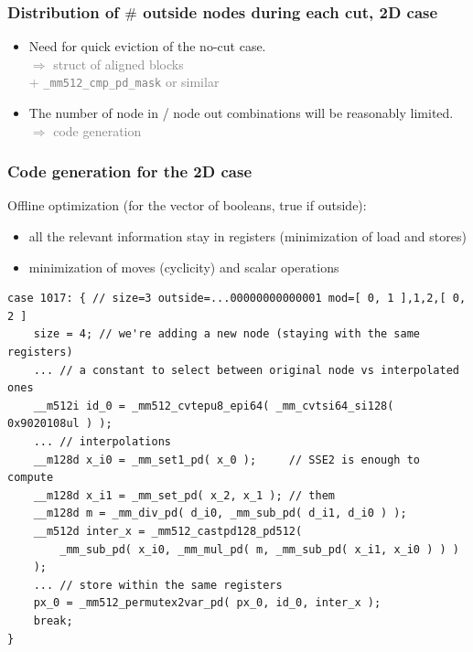 \documentclass[aspectratio=169]{beamer}
\begin{document}
\begin{frame}
    \frametitle{Distribution of $\#$ outside nodes during each cut, 2D case}

    \begin{minipage}[c][0.6\textheight][c]{0.4\textwidth}
        
    \end{minipage}
    \textwidth
    \begin{minipage}{0.55\textwidth}
        \begin{itemize}
            \item Need for quick eviction of the no-cut case.
            \\ \hfill {\textcolor{gray}{$\Rightarrow$ struct of aligned blocks}}
            \\ \hfill {\textcolor{gray}{+ \texttt{\_mm512\_cmp\_pd\_mask} or similar}}
            
            \bigskip
            \item The number of node in / node out combinations will be reasonably limited. 
            \\ \hfill {\textcolor{gray}{$\Rightarrow$ code generation}}
        \end{itemize}
    \end{minipage}
\end{frame}


\begin{frame}[fragile]
    \frametitle{Code generation for the 2D case}

    Offline optimization (for the vector of booleans, true if outside):
    \begin{itemize}
        \item all the relevant information stay in registers 
              (minimization of load and stores)
        \item minimization of moves (cyclicity) and scalar operations
    \end{itemize}

\begin{footnotesize}
\begin{lstlisting} 
case 1017: { // size=3 outside=...00000000000001 mod=[ 0, 1 ],1,2,[ 0, 2 ]
    size = 4; // we're adding a new node (staying with the same registers)
    ... // a constant to select between original node vs interpolated ones
    __m512i id_0 = _mm512_cvtepu8_epi64( _mm_cvtsi64_si128( 0x9020108ul ) );
    ... // interpolations
    __m128d x_i0 = _mm_set1_pd( x_0 );     // SSE2 is enough to compute 
    __m128d x_i1 = _mm_set_pd( x_2, x_1 ); // them
    __m128d m = _mm_div_pd( d_i0, _mm_sub_pd( d_i1, d_i0 ) );
    __m512d inter_x = _mm512_castpd128_pd512( 
        _mm_sub_pd( x_i0, _mm_mul_pd( m, _mm_sub_pd( x_i1, x_i0 ) ) )
    );
    ... // store within the same registers
    px_0 = _mm512_permutex2var_pd( px_0, id_0, inter_x );
    break;
}
\end{lstlisting}
\end{footnotesize}
\end{frame}
\end{document}
